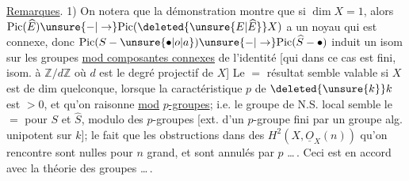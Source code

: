 \uline{Remarques}. 1) On notera que la démonstration
montre que si $\dim X=1$, alors $\mathrm{Pic}(\widehat E)\unsure{-|\to}\mathrm{Pic}(\deleted{\unsure{E|\widehat E}}X)$
a un noyau qui est connexe,  donc
$\mathrm{Pic}(S-\unsure{\bullet|o|a})\unsure{-|\to}\mathrm{Pic}(\widehat S-\bullet)$ induit un isom sur les
groupes \uline{mod composantes connexes} de l'identité
[qui dans ce cas est fini, isom. à $\mathbb Z/d\mathbb Z$ où
$d$ est le degré projectif de $X$] Le $=$ résultat
semble valable si $X$ est de dim quelconque,
lorsque  la caractéristique 
$p$ de $\deleted{\unsure{k}}k$ est $>0$, et qu'on raisonne
\uline{mod} \uline{$p$-groupes}; i.e. le groupe de N.S. local
semble le $=$ pour $S$ et $\widehat S$, modulo des
$p$-groupes [ext. d'un $p$-groupe fini par un
groupe alg. unipotent sur $k$];  le
fait que les obstructions dans des
$H^2(X,\underline O_X(n))$ qu'on rencontre sont nulles
pour $n$ grand, et sont annulés par $p$ \ldots\,. 
Ceci est en accord avec la théorie des
groupes  \ldots\,. 
